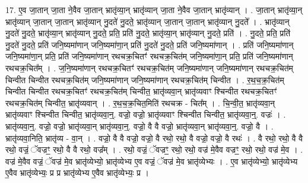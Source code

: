 \documentclass[17pt]{extarticle}
\begin{document}
17. ए॒व जा॒तान् जा॒ता ने॒वैव जा॒तान् भ्रातृ॑व्या॒न् भ्रातृ॑व्यान् जा॒ता ने॒वैव जा॒तान् भ्रातृ॑व्यान् । . जा॒तान् भ्रातृ॑व्या॒न् भ्रातृ॑व्यान् जा॒तान् जा॒तान् भ्रातृ॑व्यान् नु॒दते॑ नु॒दते॒ भ्रातृ॑व्यान् जा॒तान् जा॒तान् भ्रातृ॑व्यान् नु॒दते᳚ । . भ्रातृ॑व्यान् नु॒दते॑ नु॒दते॒ भ्रातृ॑व्या॒न् भ्रातृ॑व्यान् नु॒दते॒ प्रति॒ प्रति॑ नु॒दते॒ भ्रातृ॑व्या॒न् भ्रातृ॑व्यान् नु॒दते॒ प्रति॑ । . नु॒दते॒ प्रति॒ प्रति॑ नु॒दते॑ नु॒दते॒ प्रति॑ जनि॒ष्यमा॑णान् जनि॒ष्यमा॑णा॒न् प्रति॑ नु॒दते॑ नु॒दते॒ प्रति॑ जनि॒ष्यमा॑णान् । . प्रति॑ जनि॒ष्यमा॑णान् जनि॒ष्यमा॑णा॒न् प्रति॒ प्रति॑ जनि॒ष्यमा॑णान् रथचक्र॒चितꣳ॑ रथचक्र॒चित॑म् जनि॒ष्यमा॑णा॒न् प्रति॒ प्रति॑ जनि॒ष्यमा॑णान् रथचक्र॒चित᳚म् । . ज॒नि॒ष्यमा॑णान् रथचक्र॒चितꣳ॑ रथचक्र॒चित॑म् जनि॒ष्यमा॑णान् जनि॒ष्यमा॑णान् रथचक्र॒चित॑म् चिन्वीत चिन्वीत रथचक्र॒चित॑म् जनि॒ष्यमा॑णान् जनि॒ष्यमा॑णान् रथचक्र॒चित॑म् चिन्वीत । . र॒थ॒च॒क्र॒चित॑म् चिन्वीत चिन्वीत रथचक्र॒चितꣳ॑ रथचक्र॒चित॑म् चिन्वीत॒ भ्रातृ॑व्यवा॒न् भ्रातृ॑व्यवाꣳ श्चिन्वीत रथचक्र॒चितꣳ॑ रथचक्र॒चित॑म् चिन्वीत॒ भ्रातृ॑व्यवान् । . र॒थ॒च॒क्र॒चित॒मिति॑ रथचक्र - चित᳚म् । . चि॒न्वी॒त॒ भ्रातृ॑व्यवा॒न् भ्रातृ॑व्यवाꣳ श्चिन्वीत चिन्वीत॒ भ्रातृ॑व्यवा॒न्॒. वज्रो॒ वज्रो॒ भ्रातृ॑व्यवाꣳ श्चिन्वीत चिन्वीत॒ भ्रातृ॑व्यवा॒न्॒. वज्रः॑ । . भ्रातृ॑व्यवा॒न्॒. वज्रो॒ वज्रो॒ भ्रातृ॑व्यवा॒न् भ्रातृ॑व्यवा॒न्॒. वज्रो॒ वै वै वज्रो॒ भ्रातृ॑व्यवा॒न् भ्रातृ॑व्यवा॒न्॒. वज्रो॒ वै । . भ्रातृ॑व्यवा॒निति॒ भ्रातृ॑व्य - वा॒न् । . वज्रो॒ वै वै वज्रो॒ वज्रो॒ वै रथो॒ रथो॒ वै वज्रो॒ वज्रो॒ वै रथः॑ । . वै रथो॒ रथो॒ वै वै रथो॒ वज्रं॒ ॅवज्रꣳ॒॒ रथो॒ वै वै रथो॒ वज्र᳚म् । . रथो॒ वज्रं॒ ॅवज्रꣳ॒॒ रथो॒ रथो॒ वज्र॑ मे॒वैव वज्रꣳ॒॒ रथो॒ रथो॒ वज्र॑ मे॒व । . वज्र॑ मे॒वैव वज्रं॒ ॅवज्र॑ मे॒व भ्रातृ॑व्येभ्यो॒ भ्रातृ॑व्येभ्य ए॒व वज्रं॒ ॅवज्र॑ मे॒व भ्रातृ॑व्येभ्यः । . ए॒व भ्रातृ॑व्येभ्यो॒ भ्रातृ॑व्येभ्य ए॒वैव भ्रातृ॑व्येभ्यः॒ प्र प्र भ्रातृ॑व्येभ्य ए॒वैव भ्रातृ॑व्येभ्यः॒ प्र । \newline
\end{document}
